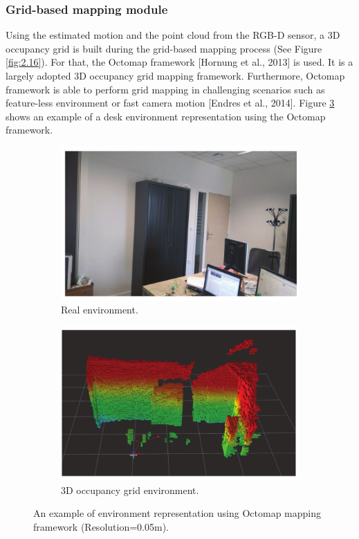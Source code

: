 \subsubsection{Grid-based mapping module}
Using the estimated motion and the point cloud from the RGB-D sensor, a 3D occupancy grid is built during the grid-based mapping process (See Figure \ref{fig:2.16}). For that, the Octomap framework [Hornung et al., 2013] is used. It is a largely adopted 3D occupancy grid mapping framework. Furthermore, Octomap framework is able to perform grid mapping in challenging scenarios such as feature-less environment or fast camera motion [Endres et al., 2014]. Figure \ref{fig:2.18} shows an example of a desk environment representation using the Octomap framework.
\begin{figure}[H]
    \centering
    \begin{subfigure}[h]{0.4\linewidth}
        \centering
        \includegraphics[width=\linewidth]{assets/2_18_a.png}
        \caption{{Real environment.}}
        \label{fig:2.18a}
    \end{subfigure}
    \hfill
    \begin{subfigure}[h]{0.4\linewidth}
        \centering
        \includegraphics[width=\linewidth]{assets/2_18_b.png}
        \caption{{3D occupancy grid environment.}}
        \label{fig:2.18b}
    \end{subfigure}
    \caption{An example of environment representation using Octomap mapping framework (Resolution=0.05m).}
    \label{fig:2.18}
\end{figure}
